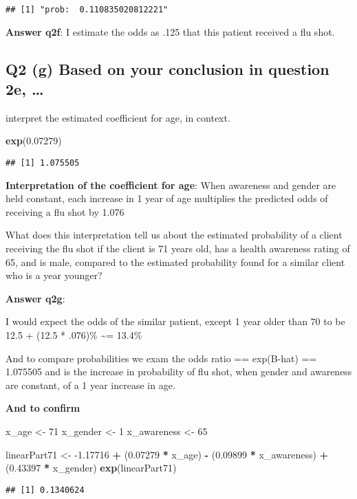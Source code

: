 \documentclass[
]{article}
\newenvironment{Shaded}{\begin{snugshade}}{\end{snugshade}}
\newcommand{\DecValTok}[1]{\textcolor[rgb]{0.00,0.00,0.81}{#1}}
\newcommand{\FloatTok}[1]{\textcolor[rgb]{0.00,0.00,0.81}{#1}}
\newcommand{\KeywordTok}[1]{\textcolor[rgb]{0.13,0.29,0.53}{\textbf{#1}}}
\newcommand{\NormalTok}[1]{#1}
\newcommand{\OperatorTok}[1]{\textcolor[rgb]{0.81,0.36,0.00}{\textbf{#1}}}
\newcommand{\StringTok}[1]{\textcolor[rgb]{0.31,0.60,0.02}{#1}}
\begin{document}
\begin{verbatim}
## [1] "prob:  0.110835020812221"
\end{verbatim}

\textbf{Answer q2f}: I estimate the odds as .125 that this patient
received a flu shot.

\hypertarget{q2-g-based-on-your-conclusion-in-question-2e}{%
\subsection{Q2 (g) Based on your conclusion in question 2e,
\ldots{}}\label{q2-g-based-on-your-conclusion-in-question-2e}}

interpret the estimated coefficient for age, in context.

\begin{Shaded}
\begin{Highlighting}[]
\KeywordTok{exp}\NormalTok{(}\FloatTok{0.07279}\NormalTok{)}
\end{Highlighting}
\end{Shaded}

\begin{verbatim}
## [1] 1.075505
\end{verbatim}

\textbf{Interpretation of the coefficient for age}: When awareness and
gender are held constant, each increase in 1 year of age multiplies the
predicted odds of receiving a flu shot by 1.076

What does this interpretation tell us about the estimated probability of
a client receiving the flu shot if the client is 71 years old, has a
health awareness rating of 65, and is male, compared to the estimated
probability found for a similar client who is a year younger?

\textbf{Answer q2g}:

I would expect the odds of the similar patient, except 1 year older than
70 to be 12.5 + (12.5 * .076)\% \textasciitilde= 13.4\%

And to compare probabilities we exam the odds ratio == exp(B-hat) ==
1.075505 and is the increase in probability of flu shot, when gender and
awareness are constant, of a 1 year increase in age.

\textbf{And to confirm}

\begin{Shaded}
\begin{Highlighting}[]
\NormalTok{x_age <-}\StringTok{ }\DecValTok{71}
\NormalTok{x_gender <-}\StringTok{ }\DecValTok{1}
\NormalTok{x_awareness <-}\StringTok{ }\DecValTok{65}

\NormalTok{linearPart71 <-}\StringTok{ }\FloatTok{-1.17716} \OperatorTok{+}\StringTok{ }\NormalTok{(}\FloatTok{0.07279} \OperatorTok{*}\StringTok{ }\NormalTok{x_age) }\OperatorTok{-}\StringTok{ }\NormalTok{(}\FloatTok{0.09899} \OperatorTok{*}\StringTok{ }\NormalTok{x_awareness) }\OperatorTok{+}\StringTok{ }\NormalTok{(}\FloatTok{0.43397} \OperatorTok{*}\StringTok{ }\NormalTok{x_gender)}
\KeywordTok{exp}\NormalTok{(linearPart71)}
\end{Highlighting}
\end{Shaded}

\begin{verbatim}
## [1] 0.1340624
\end{verbatim}
\end{document}
